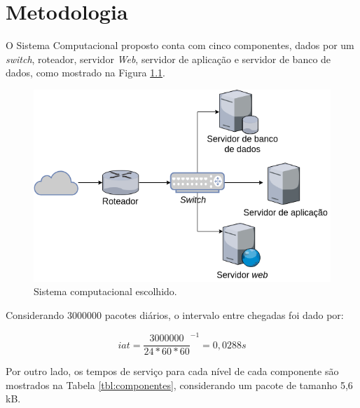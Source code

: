 \chapter{Metodologia} \label{ch:MM} %

O Sistema Computacional proposto conta com cinco componentes, dados por um \textit{switch}, roteador, servidor \textit{Web}, servidor de aplicação e servidor de banco de dados, como mostrado na Figura \ref{img:modelo}.

\begin{figure}[H]
    \centering
        \caption{\label{img:modelo} Sistema computacional escolhido.}
        \includegraphics[scale=0.5]{img/modelo.png}
    \end{figure}

Considerando 3000000 pacotes diários, o intervalo entre chegadas foi dado por:

\begin{equation*}
    iat = {\frac{3000000}{24*60*60}}^{-1} = 0,0288 s
\end{equation*}

Por outro lado, os tempos de serviço para cada nível de cada componente são mostrados na Tabela \ref{tbl:componentes}, considerando um pacote de tamanho 5,6 kB.

